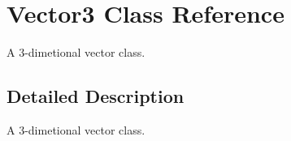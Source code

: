 \hypertarget{class_vector3}{\section{Vector3 Class Reference}
\label{class_vector3}
}


A 3-\/dimetional vector class.  




\subsection{Detailed Description}
A 3-\/dimetional vector class. 